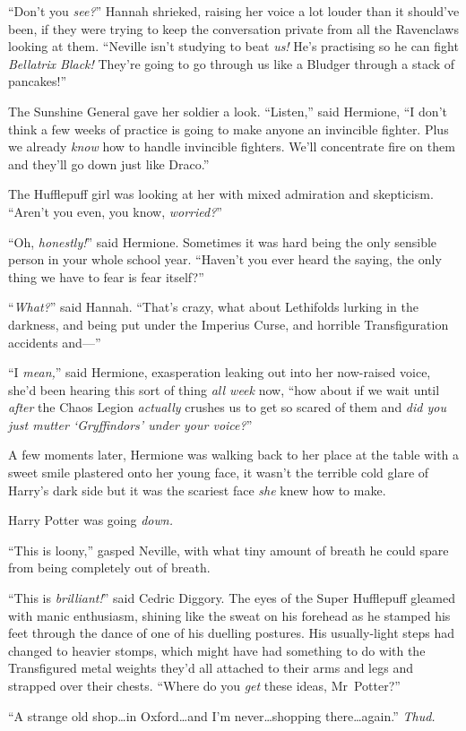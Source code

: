 “Don’t you \emph{see?}” Hannah shrieked, raising her voice a lot louder than it should’ve been, if they were trying to keep the conversation private from all the Ravenclaws looking at them. “Neville isn’t studying to beat \emph{us!} He’s practising so he can fight \emph{Bellatrix Black!} They’re going to go through us like a Bludger through a stack of pancakes!”

The Sunshine General gave her soldier a look. “Listen,” said Hermione, “I don’t think a few weeks of practice is going to make anyone an invincible fighter. Plus we already \emph{know} how to handle invincible fighters. We’ll concentrate fire on them and they’ll go down just like Draco.”

The Hufflepuff girl was looking at her with mixed admiration and skepticism. “Aren’t you even, you know, \emph{worried?}”

“Oh, \emph{honestly!}” said Hermione. Sometimes it was hard being the only sensible person in your whole school year. “Haven’t you ever heard the saying, the only thing we have to fear is fear itself?”

“\emph{What?}” said Hannah. “That’s crazy, what about Lethifolds lurking in the darkness, and being put under the Imperius Curse, and horrible Transfiguration accidents and—”

“I \emph{mean,}” said Hermione, exasperation leaking out into her now-raised voice, she’d been hearing this sort of thing \emph{all week} now, “how about if we wait until \emph{after} the Chaos Legion \emph{actually} crushes us to get so scared of them and \emph{did you just mutter ‘Gryffindors’ under your voice?}”

A few moments later, Hermione was walking back to her place at the table with a sweet smile plastered onto her young face, it wasn’t the terrible cold glare of Harry’s dark side but it was the scariest face \emph{she} knew how to make.

Harry Potter was going \emph{down.}

\later

“This is loony,” gasped Neville, with what tiny amount of breath he could spare from being completely out of breath.

“This is \emph{brilliant!}” said Cedric Diggory. The eyes of the Super Hufflepuff gleamed with manic enthusiasm, shining like the sweat on his forehead as he stamped his feet through the dance of one of his duelling postures. His usually-light steps had changed to heavier stomps, which might have had something to do with the Transfigured metal weights they’d all attached to their arms and legs and strapped over their chests. “Where do you \emph{get} these ideas, Mr~Potter?”

“A strange old shop…in Oxford…and I’m never…shopping
there…again.” \emph{Thud.}

